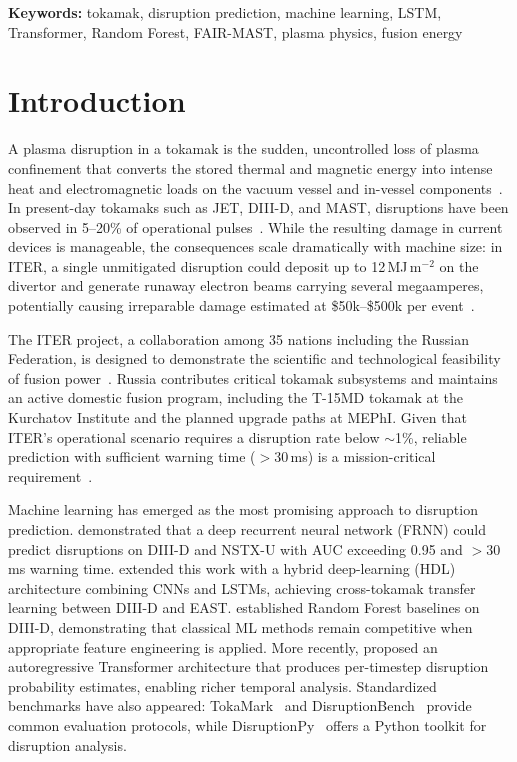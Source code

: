 \documentclass[twocolumn]{article}
\begin{document}
\noindent\textbf{Keywords:} tokamak, disruption prediction, machine learning,
LSTM, Transformer, Random Forest, FAIR-MAST, plasma physics, fusion energy


\section{Introduction}
\label{sec:intro}

A plasma disruption in a tokamak is the sudden, uncontrolled loss
of plasma confinement that converts the stored thermal and magnetic
energy into intense heat and electromagnetic loads on
the vacuum vessel and in-vessel components~\citep{schuller1995}.
In present-day tokamaks such as JET, DIII-D, and MAST,
disruptions have been observed in 5--20\% of operational
pulses~\citep{devries2011}.
While the resulting damage in current devices is manageable,
the consequences scale dramatically with machine size:
in ITER, a single unmitigated disruption could deposit up to
12\,MJ\,m$^{-2}$ on the divertor and generate runaway electron
beams carrying several megaamperes, potentially causing
irreparable damage estimated at \$50k--\$500k per
event~\citep{lehnen2015, hender2007}.

The ITER project, a collaboration among 35 nations including
the Russian Federation, is designed to demonstrate the scientific
and technological feasibility of fusion power~\citep{iter2007}.
Russia contributes critical tokamak subsystems and maintains an
active domestic fusion program, including the T-15MD tokamak at
the Kurchatov Institute and the planned upgrade paths at MEPhI.
Given that ITER's operational scenario requires a disruption rate
below $\sim$1\%, reliable prediction with sufficient warning time
($> 30$\,ms) is a mission-critical requirement~\citep{lehnen2015}.

Machine learning has emerged as the most promising approach to
disruption prediction.
\citet{kates-harbeck2019} demonstrated that a deep recurrent
neural network (FRNN) could predict disruptions on DIII-D and
NSTX-U with AUC exceeding 0.95 and $> 30$\,ms warning time.
\citet{zhu2020} extended this work with a hybrid deep-learning
(HDL) architecture combining CNNs and LSTMs, achieving
cross-tokamak transfer learning between DIII-D and EAST.
\citet{rea2018} established Random Forest baselines on DIII-D,
demonstrating that classical ML methods remain competitive
when appropriate feature engineering is applied.
More recently, \citet{spangher2024} proposed an autoregressive
Transformer architecture that produces per-timestep disruption
probability estimates, enabling richer temporal analysis.
Standardized benchmarks have also appeared:
TokaMark~\citep{tokamark2026} and
DisruptionBench~\citep{disruptionbench2025} provide common
evaluation protocols, while
DisruptionPy~\citep{disruptionpy2024} offers a Python toolkit
for disruption analysis.
\end{document}
